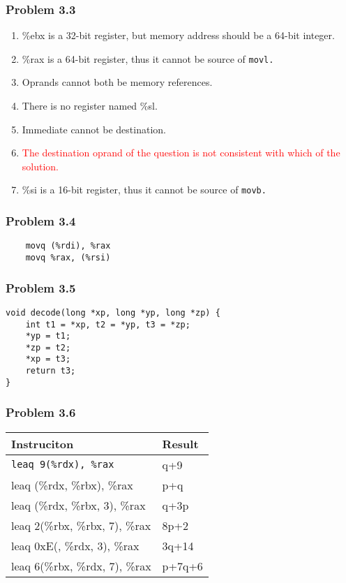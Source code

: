 \documentclass[a4paper]{article}
\begin{document}
\subsubsection*{Problem 3.3}
\begin{enumerate}
    \rm{}
    \item \%ebx is a 32-bit register, but memory address should be a 64-bit integer.
    \item \%rax is a 64-bit register, thus it cannot be source of \tt{movl}\rm{.}
    \item Oprands cannot both be memory references.
    \item There is no register named \%sl.
    \item Immediate cannot be destination.
    \item \textcolor{red}{The destination oprand of the question is not consistent with which of the solution.}
    \item \%si is a 16-bit register, thus it cannot be source of \tt{movb}\rm{.}
\end{enumerate}

\subsubsection*{Problem 3.4}
\begin{lstlisting}
    movq (%rdi), %rax
    movq %rax, (%rsi)
\end{lstlisting}

\subsubsection*{Problem 3.5}
\begin{lstlisting}
void decode(long *xp, long *yp, long *zp) {
    int t1 = *xp, t2 = *yp, t3 = *zp;
    *yp = t1;
    *zp = t2;
    *xp = t3;
    return t3;
}
\end{lstlisting}

\subsubsection*{Problem 3.6}
\begin{tabular}{ll}
    Instruciton&Result\\\hline
    \tt{leaq 9(\%rdx), \%rax}&q+9\\
    leaq (\%rdx, \%rbx), \%rax&p+q\\
    leaq (\%rdx, \%rbx, 3), \%rax&q+3p\\
    leaq 2(\%rbx, \%rbx, 7), \%rax&8p+2\\
    leaq 0xE(, \%rdx, 3), \%rax&3q+14\\
    leaq 6(\%rbx, \%rdx, 7), \%rax&p+7q+6
\end{tabular}
\end{document}

